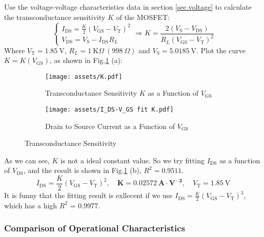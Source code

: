 \documentclass[UTF8]{article}
\def\KO{\ \mathrm{K}\Omega}
\def\KO{\ \mathrm{K}\Omega}
\theoremstyle{MyLineTheoremStyle} %
\theoremstyle{MyBlockTheoremStyle} %
\theoremstyle{MySubsubsectionStyle} %
\begin{document}
Use the voltage-voltage characteristics data in section \ref{sec.voltage} to calculate the transconductance sensitivity $K$ of the MOSFET:
\begin{equation}
    \begin{cases}
        I_\text{DS} = \frac{K}{2} \left(V_\text{GS} - V_\text{T}\right)^2 \\ 
        V_\text{DS} = V_\text{S} - I_\text{DS} R_L
    \end{cases}
\Longrightarrow K = \frac{2 \left(V_\text{S} - V_\text{DS}\right)}{R_L \left(V_\text{GS} - V_\text{T}\right)^2}
\end{equation}
Where $V_\text{T} = 1.85 \ \mathrm{V}$, $R_L = 1 \KO\ (998\ \Omega)$ and $V_\text{S} = 5.0185 \ \mathrm{V}$. Plot the curve $K = K(V_\text{GS})$, as shown in Fig.\ref{Transconductance Sensitivity} (a):
\begin{figure}[H]\centering
\begin{subfigure}[b]{0.5\columnwidth}\centering
    \texttt{[image: assets/K.pdf]}
    \caption{Transconductance Sensitivity $K$ as a Function of $V_\text{GS}$}
\end{subfigure}\hfill
\begin{subfigure}[b]{0.5\columnwidth}\centering
    \texttt{[image: assets/I\_DS-V\_GS fit K.pdf]}
    \caption{Drain to Source Current as a Function of $V_\text{GS}$ }
\end{subfigure}
\caption{Transconductance Sensitivity}
\label{Transconductance Sensitivity}
\end{figure}
As we can see, $K$ is not a ideal constant value. So we try fitting $I_\text{DS}$ as a function of $V_\text{DS}$, and the result is shown in Fig.\ref{Transconductance Sensitivity} (b), $R^2 = 0.9511$.
\begin{equation}
I_\text{DS} = \frac{K}{2}\left(V_\text{GS} - V_\text{T}\right)^2,\quad \mathbf{K = 0.02572 \ A\cdot V^{-2}},\quad V_\text{T} = 1.85 \ \mathrm{V}
\end{equation}
It is funny that the fitting result is exllecent if we use $I_\text{DS} = \frac{K}{2}\left(V_\text{GS} - V_\text{T}\right)^3$, which has a high $R^2$ = 0.9977.

\subsubsection{Comparison of Operational Characteristics}
\end{document}
